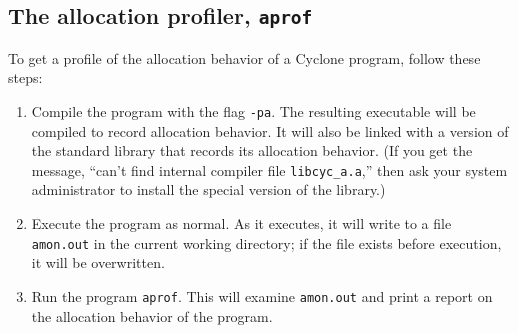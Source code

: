 \subsection{The allocation profiler, \texttt{aprof}}

To get a profile of the allocation behavior of a Cyclone program,
follow these steps:
\begin{enumerate}
\item Compile the program with the flag \texttt{-pa}.  The resulting
  executable will be compiled to record allocation behavior.  It will
  also be linked with a version of the standard library that records
  its allocation behavior.  (If you get the message, ``can't find
  internal compiler file \texttt{libcyc_a.a},'' then ask your system
  administrator to install the special version of the library.)
\item Execute the program as normal.  As it executes, it will write to
  a file \texttt{amon.out} in the current working directory; if the
  file exists before execution, it will be overwritten.
\item Run the program \texttt{aprof}.  This will examine
  \texttt{amon.out} and print a report on the allocation behavior of
  the program.
\end{enumerate}

